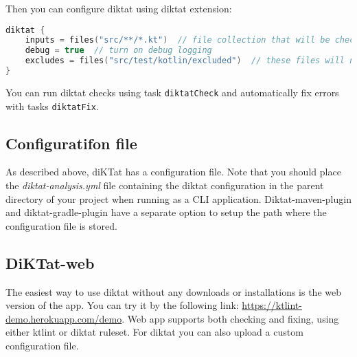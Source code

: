 Then you can configure diktat using diktat extension:

\begin{lstlisting}[caption={DiKTat extension}, label={lst:gradle2}, language=Kotlin]
diktat {
    inputs = files("src/**/*.kt")  // file collection that will be checked by diktat
    debug = true  // turn on debug logging
    excludes = files("src/test/kotlin/excluded")  // these files will not be checked by diktat
}
\end{lstlisting}

You can run diktat checks using task \texttt{diktatCheck} and automatically fix errors with tasks \texttt{diktatFix}.

\subsection{Configuratifon file}
As described above, diKTat has a configuration file. Note that you should place the \textsl{diktat-analysis.yml} file containing the diktat configuration in the parent directory of your project when running as a CLI application. Diktat-maven-plugin and diktat-gradle-plugin have a separate option to setup the path where the configuration file is stored.

\subsection{DiKTat-web}
The easiest way to use diktat without any downloads or installations is the web version of the app. You can try it by the following link: \url{https://ktlint-demo.herokuapp.com/demo}. Web app supports both checking and fixing, using either ktlint or diktat ruleset. For diktat you can also upload a custom configuration file.

